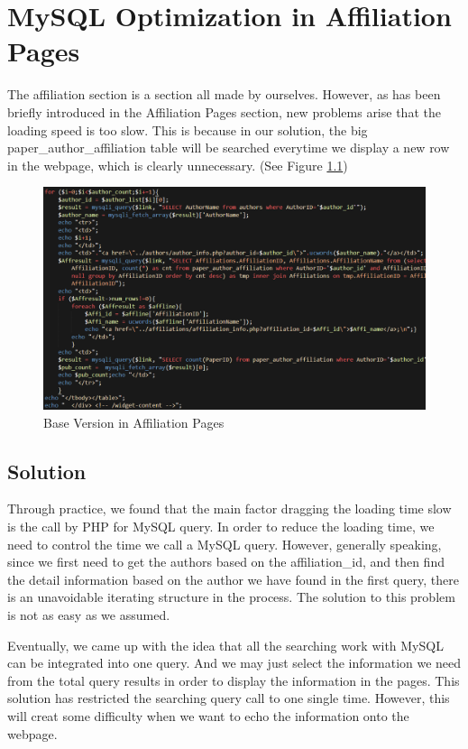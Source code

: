 \documentclass{book}
\begin{document}
\chapter {MySQL Optimization in Affiliation Pages}

The affiliation section is a section all made by ourselves. However, as has been briefly introduced in the Affiliation Pages section, new problems arise that the loading speed is too slow. This is because in our solution, the big paper\_author\_affiliation table will be searched everytime we display a new row in the webpage, which is clearly unnecessary. (See Figure \ref{fig:opt_basic})
{}
\begin{figure}[H]
\centering{}
\includegraphics[scale=0.45]{img/zlt_opt_code_basic.png}
\caption{Base Version in Affiliation Pages}
\label{fig:opt_basic}
\end{figure}


\section {Solution}
Through practice, we found that the main factor dragging the loading time slow is the call by PHP for MySQL query. In order to reduce the loading time, we need to control the time we call a MySQL query. However, generally speaking, since we first need to get the authors based on the affiliation\_id, and then find the detail information based on the author we have found in the first query, there is an unavoidable iterating structure in the process. The solution to this problem is not as easy as we assumed.

Eventually, we came up with the idea that all the searching work with MySQL can be integrated into one query. And we may just select the information we need from the total query results in order to display the information in the pages. This solution has restricted the searching query call to one single time. However, this will creat some difficulty when we want to echo the information onto the webpage.
\end{document}

